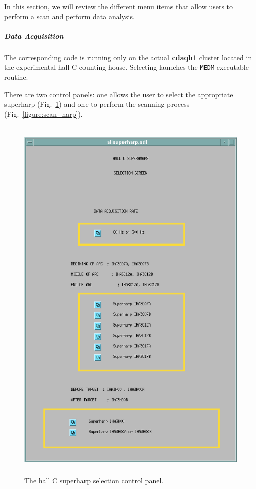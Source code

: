 In this section, we will review the different menu items that allow users to perform a scan and
perform data analysis.

	\subparagraph{Data Acquisition}\label{daq}

The corresponding code is running only on the actual {\bf cdaqh1} cluster located in the experimental
hall C counting house. Selecting {\bf{}} launches the {\tt MEDM} executable routine.

There are two control panels: one allows the user to select the appropriate superharp
(Fig.~\ref{figure:choose_harp}) and one to perform the scanning process (Fig.~\ref{figure:scan_harp}).

\begin{figure}[!hbt]
\begin{center}
\includegraphics[height=7.2in]{beamline/superharpChoicePanel.ps}
\caption{The hall C superharp selection control panel.}\label{figure:choose_harp}
\end{center}
\end{figure}


